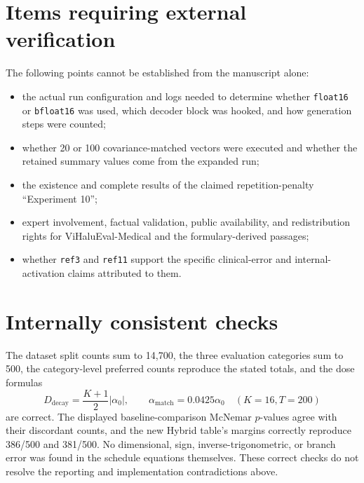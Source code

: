 \documentclass[11pt]{article}
\begin{document}
\section*{Items requiring external verification}

The following points cannot be established from the manuscript alone:

\begin{itemize}
 \item the actual run configuration and logs needed to determine whether \texttt{float16} or \texttt{bfloat16} was used, which decoder block was hooked, and how generation steps were counted;
 \item whether 20 or 100 covariance-matched vectors were executed and whether the retained summary values come from the expanded run;
 \item the existence and complete results of the claimed repetition-penalty ``Experiment 10'';
 \item expert involvement, factual validation, public availability, and redistribution rights for ViHaluEval-Medical and the formulary-derived passages;
 \item whether \texttt{ref3} and \texttt{ref11} support the specific clinical-error and internal-activation claims attributed to them.
\end{itemize}

\section*{Internally consistent checks}

The dataset split counts sum to 14,700, the three evaluation categories sum to 500, the category-level preferred counts reproduce the stated totals, and the dose formulas
\[
 D_{\text{decay}}=\frac{K+1}{2}|\alpha_0|,
 \qquad
 \alpha_{\text{match}}=0.0425\alpha_0
 \quad(K=16,T=200)
\]
are correct.  The displayed baseline-comparison McNemar $p$-values agree with their discordant counts, and the new Hybrid table's margins correctly reproduce 386/500 and 381/500.  No dimensional, sign, inverse-trigonometric, or branch error was found in the schedule equations themselves.  These correct checks do not resolve the reporting and implementation contradictions above.
\end{document}
